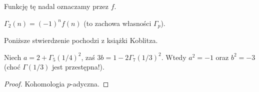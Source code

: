 Funkcję tę nadal oznaczamy przez $f$.

\begin{definicja}
	$\Gamma_2 (n) = (-1)^n f(n)$ (to zachowa własności $\Gamma_p$).
\end{definicja}

Poniższe stwierdzenie pochodzi z książki Koblitza.

\begin{fakt}
	Niech $a = 2 + \Gamma_5(1/4)^2$, zaś $3b = 1 - 2 \Gamma_7(1/3)^2$.
	Wtedy $a^2 = -1$ oraz $b^2 = -3$ (choć $\Gamma(1/3)$ jest przestępna!).
\end{fakt}

\begin{proof}
	Kohomologia $p$-adyczna.
\end{proof}